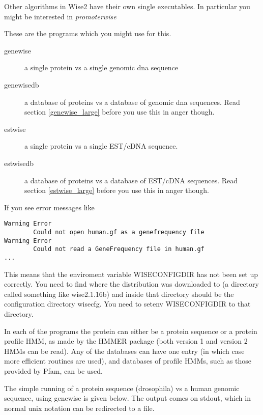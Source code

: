 \documentclass{article}
\begin{document}
Other algorithms in Wise2 have their own single executables. In particular
you might be interested in \emph{promoterwise}

These are the programs which you might use for this.

\begin{description}
\item[genewise] a single protein vs a single genomic dna sequence
\item[genewisedb] a database of proteins vs a database of genomic dna sequences. Read
section \ref{genewise_large} before you use this in anger though.
\item[estwise] a single protein vs a single EST/cDNA sequence. 
\item[estwisedb] a database of proteins vs a database of EST/cDNA sequences. Read
section \ref{estwise_large} before you use this in anger though.
\end{description}

If you see error messages like
\begin{verbatim}
Warning Error
        Could not open human.gf as a genefrequency file
Warning Error
        Could not read a GeneFrequency file in human.gf
...
\end{verbatim}
This means that the enviroment variable WISECONFIGDIR has not been
set up correctly. You need to find where the distribution was downloaded
to (a directory called something like wise2.1.16b) and inside that
directory should be the configuration directory wisecfg. You need to
setenv WISECONFIGDIR to that directory.

In each of the programs the protein can either be a protein sequence
or a protein profile HMM, as made by the HMMER package (both version 1
and version 2 HMMs can be read). Any of the databases can have one
entry (in which case more efficient routines are used), and databases
of profile HMMs, such as those provided by Pfam, can be used.

The simple running of a protein sequence (drosophila) vs a human genomic sequence,
using genewise is given below. The output comes on stdout, which in normal unix
notation can be redirected to a file.
\end{document}
